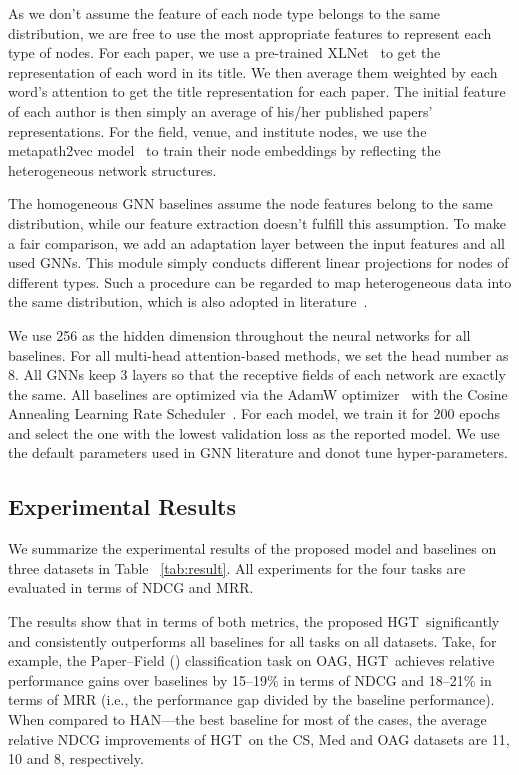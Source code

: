 \documentclass[sigconf]{acmart}
\theoremstyle{definition}
\newcommand{\short}{HGT}
\begin{document}
As we don't assume the feature of each node type belongs to the same distribution, we are free to use the most appropriate features to represent each type of nodes. 
For each paper, we use a pre-trained XLNet~\cite{xlnet, wolf2019transformers} to get the representation of each word in its title. 
We then average them weighted by each word's attention to get the title representation for each paper. 
The initial feature of each author is then simply an average of his/her published papers' representations. 
For the field, venue, and institute nodes, we use the metapath2vec model~\cite{dong2017metapath2vec} to train their node embeddings by reflecting the heterogeneous network structures. 



The homogeneous GNN baselines assume the node features belong to the same distribution, while our feature extraction doesn't fulfill this assumption. 
To make a fair comparison, we add an adaptation layer between the input features and all used GNNs. 
This module simply conducts different linear projections for nodes of different  types. 
Such a procedure can be regarded to map heterogeneous data into the same distribution, which is also adopted in literature~\cite{DBLP:conf/kdd/ZhangSHSC19, DBLP:conf/www/WangJSWYCY19}. 

We use 256 as the hidden dimension throughout the neural networks for all baselines. For all multi-head attention-based methods, we set the head number as 8. 
All GNNs keep 3 layers so that the receptive fields of each network are exactly the same. 
All baselines are optimized via the AdamW optimizer~\cite{DBLP:conf/iclr/LoshchilovH19} with the Cosine Annealing Learning Rate Scheduler~\cite{DBLP:conf/iclr/LoshchilovH17}. For each model, we train it for 200 epochs and select the one with the lowest validation loss as the reported model. We use the default parameters used in GNN literature and donot tune hyper-parameters. 





\subsection{Experimental Results}
We summarize the experimental results of the proposed model and baselines on three datasets in  Table ~\ref{tab:result}. 
All experiments for the four tasks are evaluated in terms of NDCG and MRR. 


The results show that in terms of both metrics, the proposed \short\ significantly and consistently outperforms all baselines for all tasks on all datasets. 
Take, for example, the Paper--Field () classification task on OAG, \short\ achieves relative performance gains over baselines by 15--19\% in terms of NDCG and 18--21\% in terms of MRR (i.e., the performance gap divided by the baseline performance). 
When compared to HAN---the best baseline for most of the cases, the average relative NDCG improvements of \short\ on the CS, Med and OAG datasets are 11, 10 and 8, respectively. 
\end{document}
